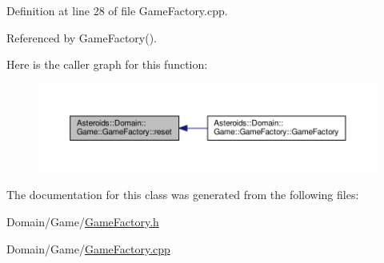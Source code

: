 Definition at line 28 of file Game\+Factory.\+cpp.



Referenced by Game\+Factory().

Here is the caller graph for this function\+:\nopagebreak
\begin{figure}[H]
\begin{center}
\leavevmode
\includegraphics[width=350pt]{classAsteroids_1_1Domain_1_1Game_1_1GameFactory_a9be2f29f1827928b0145ce42848c11b1_icgraph}
\end{center}
\end{figure}


The documentation for this class was generated from the following files\+:\begin{DoxyCompactItemize}
\item 
Domain/\+Game/\hyperlink{GameFactory_8h}{Game\+Factory.\+h}\item 
Domain/\+Game/\hyperlink{GameFactory_8cpp}{Game\+Factory.\+cpp}\end{DoxyCompactItemize}
